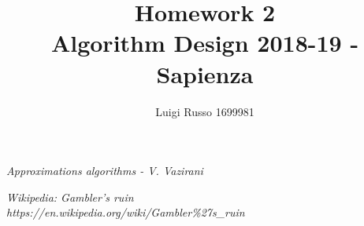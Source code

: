 \documentclass[11pt]{article}
\title{Homework 2\\
	\large Algorithm Design 2018-19 - Sapienza}
\author{Luigi Russo 1699981}
\begin{document}
	
\maketitle

\newpage
\tableofcontents
\newpage



\begin{thebibliography}{10}	
	\textsl{Approximations algorithms - V. Vazirani}
	
	\textsl{Wikipedia: Gambler's ruin} \\
	\textit{https://en.wikipedia.org/wiki/Gambler\%27s\_ruin}
	
\end{thebibliography}
\end{document}
